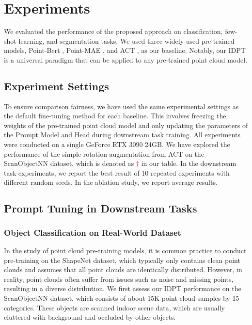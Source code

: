 \documentclass[10pt,twocolumn,letterpaper]{article}
\begin{document}
\section{Experiments}

We evaluated the performance of the proposed approach on classification, few-shot learning, and segmentation tasks. 
We used three widely used pre-trained models, Point-Bert \cite{yu2022point}, Point-MAE \cite{pang2022masked}, and ACT \cite{dong2022autoencoders}, as our baseline. 
Notably, our IDPT is a universal paradigm that can be applied to any pre-trained point cloud model. 

\subsection{Experiment Settings}

To ensure comparison fairness, we have used the same experimental settings as the default fine-tuning method for each baseline. This involves freezing the weights of the pre-trained point cloud model and only updating the parameters of the Prompt Model and Head during downstream task training. All experiments were conducted on a single GeForce RTX 3090 24GB. We have explored the performance of the simple rotation augmentation from ACT \cite{dong2022autoencoders} on the ScanObjectNN \cite{uy2019revisiting} dataset, which is denoted as \textcolor{red}{$\dagger$} in our table. 
In the downstream task experiments, we report the best result of 10 repeated experiments with different random seeds. In the ablation study, we report average results.


\subsection{Prompt Tuning in Downstream Tasks}
\subsubsection{Object Classification on Real-World Dataset} 
In the study of point cloud pre-training models, it is common practice to conduct pre-training on the ShapeNet \cite{chang2015shapenet} dataset, which typically only contains clean point clouds and assumes that all point clouds are identically distributed. However, in reality, point clouds often suffer from issues such as noise and missing points, resulting in a diverse distribution. We first assess our IDPT performance on the ScanObjectNN \cite{uy2019revisiting} dataset, which consists of about 15K point cloud samples by 15 categories. These objects are scanned indoor scene data, which are usually cluttered with background and occluded by other objects.
\end{document}

